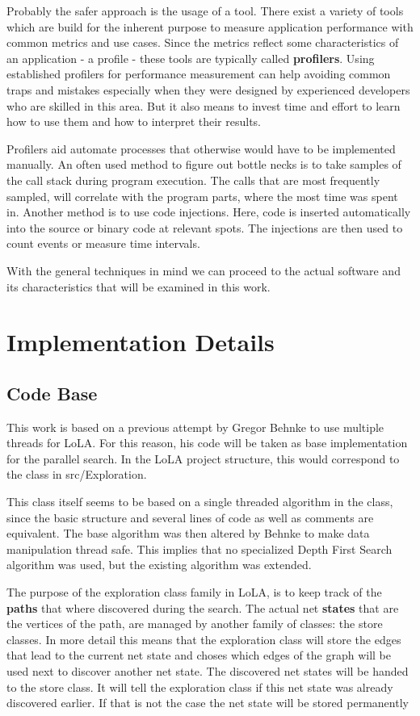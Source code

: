Probably the safer approach is the usage of a tool. There exist a variety of tools which are build for the inherent purpose to measure application performance with common metrics and use cases. Since the metrics reflect some characteristics of an application - a profile - these tools are typically called \textbf{profilers}. Using established profilers for performance measurement can help avoiding common traps and mistakes especially when they were designed by experienced developers who are skilled in this area. But it also means to invest time and effort to learn how to use them and how to interpret their results.

Profilers aid automate processes that otherwise would have to be implemented manually. An often used method to figure out bottle necks is to take samples of the call stack during program execution. The calls that are most frequently sampled, will correlate with the program parts, where the most time was spent in. Another method is to use code injections. Here, code is inserted automatically into the source or binary code at relevant spots. The injections are then used to count events or measure time intervals.

With the general techniques in mind we can proceed to the actual software and its characteristics that will be examined in this work.

\section{Implementation Details}
\subsection{Code Base}
\label{codeBase}
This work is based on a previous attempt by Gregor Behnke to use multiple threads for LoLA. For this reason, his code will be taken as base implementation for the parallel search. In the LoLA project structure, this would correspond to the  class in src/Exploration.

This class itself seems to be based on a single threaded algorithm in the  class, since the basic structure and several lines of code as well as comments are equivalent. The base algorithm was then altered by Behnke to make data manipulation thread safe. This implies that no specialized Depth First Search algorithm was used, but the existing algorithm was extended.

The purpose of the exploration class family in LoLA, is to keep track of the \textbf{paths} that where discovered during the search. The actual net \textbf{states} that are the vertices of the path, are managed by another family of classes: the store classes. In more detail this means that the exploration class will store the edges that lead to the current net state and choses which edges of the graph will be used next to discover another net state. The discovered net states will be handed to the store class. It will tell the exploration class if this net state was already discovered earlier. If that is not the case the net state will be stored permanently

